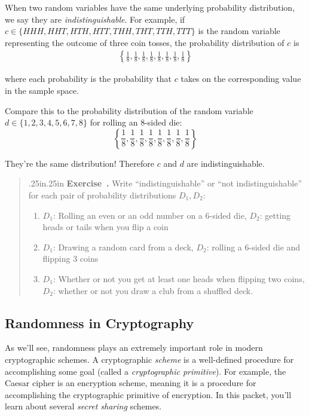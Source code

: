 \documentclass[12 pt]{article}
\newcounter{exercise}[section]
\newenvironment{exercise}{\refstepcounter{exercise}\par\bigskip \begin{quotation}{}{\leftmargin .25in\rightmargin .25in}
    \noindent \textbf{Exercise~\thesection.\theexercise }  \rmfamily}{\end{quotation}\par\bigskip}
\newcounter{example}[section]
\begin{document}
When two random variables have the same underlying probability 
distribution, we say they are \emph{indistinguishable}. For example,
if $c \in \{HHH, HHT,\allowbreak HTH, HTT, THH, THT, TTH, TTT\}$ 
is the random variable representing the outcome of three coin tosses,
the probability distribution of $c$ is 
\begin{align*}
    \left\{
        \frac{1}{8},\frac{1}{8},\frac{1}{8},\frac{1}{8},
        \frac{1}{8},\frac{1}{8},\frac{1}{8},\frac{1}{8}
    \right\}
\end{align*}

where each probability is the probability that $c$ takes on the 
corresponding value in the sample space.

Compare this to the probability distribution of the random 
variable $d \in \{1,2,3,4,5,6,7,8\}$ for rolling an 8-sided die:
\[
    \left\{
        \frac{1}{8},\frac{1}{8},\frac{1}{8},\frac{1}{8},
        \frac{1}{8},\frac{1}{8},\frac{1}{8},\frac{1}{8}
    \right\}
\]

They're the same distribution! Therefore $c$ and $d$ are 
indistinguishable.

\begin{exercise}
    Write ``indistinguishable'' or ``not indistinguishable''
    for each pair of probability distributions $D_1, D_2$:
    \renewcommand{\labelenumi}{(\alph{enumi})} 
    \begin{enumerate}
        \item $D_1$: Rolling an even or an odd number on a 6-sided die, 
        $D_2$: getting heads or tails when you flip a coin
        \item $D_1$: Drawing a random card from a deck, $D_2$: rolling a 6-sided 
        die and flipping 3 coins
        \item $D_1$: Whether or not you get at least one heads when flipping
        two coins, $D_2$: whether or not you draw a club from a shuffled 
        deck.
    \end{enumerate}
\end{exercise}

\subsection{Randomness in Cryptography}

As we'll see, randomness plays an extremely important role in modern cryptographic
schemes. A cryptographic \emph{scheme} is a well-defined procedure for accomplishing 
some goal (called a \emph{cryptographic primitive}). For example, the Caesar 
cipher is an encryption scheme\footnotemark, meaning it is a procedure for accomplishing
the cryptographic primitive of encryption. 
In this packet, you'll learn about several \emph{secret sharing} schemes.
\end{document}
